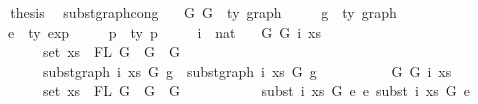 \begin{isabellebody}
\isanewline
\ \ \isamarkupfalse%
\ \isamarkupfalse%
\ {\isacharquery}{\kern0pt}thesis\ \isakeywordONE{{\isachardot}{\kern0pt}}\isamarkupfalse%
\isanewline
{}\isamarkupfalse%
%
\endisatagproof
{\isafoldproof}%
%
\isadelimproof
\isanewline
%
\endisadelimproof
\isanewline
\isanewline
{}\isamarkupfalse%
\ subst{\isacharunderscore}{\kern0pt}graph{\isacharunderscore}{\kern0pt}cong{}{\isacharcolon}{\kern0pt}\isanewline
\ \ \ G{}\ G{}\ {\isacharcolon}{\kern0pt}{\isacharcolon}{\kern0pt}\ {\isachardoublequoteopen}{\isacharprime}{\kern0pt}ty\ graph{\isachardoublequoteclose}\isanewline
\ \ \ \ \ g\ {\isacharcolon}{\kern0pt}{\isacharcolon}{\kern0pt}\ {\isachardoublequoteopen}{\isacharprime}{\kern0pt}ty\ graph{\isachardoublequoteclose}\isanewline
\ \ \ \ \ e\ {\isacharcolon}{\kern0pt}{\isacharcolon}{\kern0pt}\ {\isachardoublequoteopen}{\isacharprime}{\kern0pt}ty\ exp{\isachardoublequoteclose}\isanewline
\ \ \ \ \ p\ {\isacharcolon}{\kern0pt}{\isacharcolon}{\kern0pt}\ {\isachardoublequoteopen}{\isacharprime}{\kern0pt}ty\ p{\isachardoublequoteclose}\isanewline
\ \ \ \ \ i\ {\isacharcolon}{\kern0pt}{\isacharcolon}{\kern0pt}\ nat\isanewline
\ \ \ {\isachardoublequoteopen}{\isacharparenleft}{\kern0pt}{\isasymforall}G{}\ G{}\ i\ xs{\isachardot}{\kern0pt}\isanewline
\ \ \ \ \ \ \ \ \ \ set\ xs\ {\isacharequal}{\kern0pt}\ FL\ G{}\ {\isacharminus}{\kern0pt}{\isacharminus}{\kern0pt}{\isachargreater}{\kern0pt}\ G{}\ {\isasymsimeq}\ G{}\ {\isacharminus}{\kern0pt}{\isacharminus}{\kern0pt}{\isachargreater}{\kern0pt}\isanewline
\ \ \ \ \ \ \ \ \ \ subst{\isacharunderscore}{\kern0pt}graph\ i\ xs\ G{}\ g\ {\isasymsimeq}\ subst{\isacharunderscore}{\kern0pt}graph\ i\ xs\ G{}\ g{\isacharparenright}{\kern0pt}\ {\isasymand}\isanewline
\ \ \ \ \ \ \ \ \ {\isacharparenleft}{\kern0pt}{\isasymforall}G{}\ G{}\ i\ xs{\isachardot}{\kern0pt}\isanewline
\ \ \ \ \ \ \ \ \ \ set\ xs\ {\isacharequal}{\kern0pt}\ FL\ G{}\ {\isacharminus}{\kern0pt}{\isacharminus}{\kern0pt}{\isachargreater}{\kern0pt}\ G{}\ {\isasymsimeq}\ G{}\ {\isacharminus}{\kern0pt}{\isacharminus}{\kern0pt}{\isachargreater}{\kern0pt}\isanewline
\ \ \ \ \ \ \ \ \ \ subst\ i\ xs\ G{}\ e\ {\isasymsimeq}e\ subst\ i\ xs\ G{}\ e{\isacharparenright}{\kern0pt}\ {\isasymand}\isanewline

\end{isabellebody}
